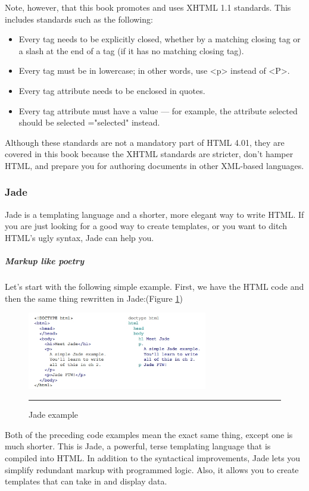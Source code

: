 Note, however, that this book promotes and uses XHTML 1.1 standards. This includes standards
such as the following:

\begin{itemize}
  \item Every tag needs to be explicitly closed, whether by a matching closing tag or a slash at the
end of a tag (if it has no matching closing tag).
  \item Every tag must be in lowercase; in other words, use <p> instead of <P>.
  \item Every tag attribute needs to be enclosed in quotes.
  \item Every tag attribute must have a value — for example, the attribute selected should be
selected ="selected" instead.
\end{itemize}
Although these standards are not a mandatory part of HTML 4.01, they are covered in this book
because the XHTML standards are stricter, don’t hamper HTML, and prepare you for authoring
documents in other XML-based languages.

\subsubsection{Jade}
Jade is a templating language and a shorter, more elegant way to write HTML. If you
are just looking for a good way to create templates, or you want to ditch HTML's
ugly syntax, Jade can help you.
\subparagraph*{Markup like poetry}
\hfill \break
Let's start with the following simple example. First, we have the HTML code and then
the same thing rewritten in Jade:(Figure \ref{fig:jade})
\begin{figure}[h!]
  \centering
    \includegraphics[width=0.7\textwidth]{./Pictures/jade.jpg}
  \rule{0.7\textwidth}{1pt}
 \caption{Jade example}
  \label{fig:jade}
\end{figure}


Both of the preceding code examples mean the exact same thing, except one is
much shorter. This is Jade, a powerful, terse templating language that is compiled
into HTML. In addition to the syntactical improvements, Jade lets you simplify
redundant markup with programmed logic. Also, it allows you to create templates
that can take in and display data.


